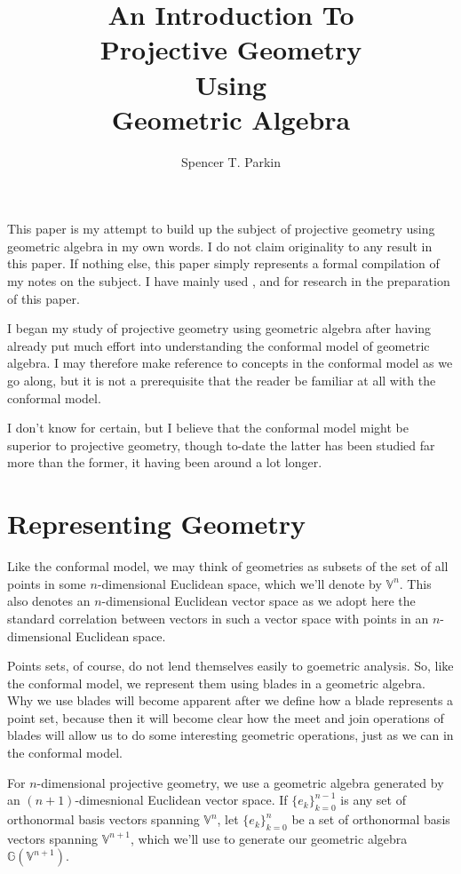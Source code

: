 \documentclass[12pt]{article}
\title{An Introduction To\\Projective Geometry\\Using\\Geometric Algebra}
\author{Spencer T. Parkin}
\newcommand{\G}{\mathbb{G}}
\newcommand{\V}{\mathbb{V}}
\begin{document}
\maketitle

This paper is my attempt to build up the subject of projective
geometry using geometric algebra in my own words.  I do not
claim originality to any result in this paper.  If nothing else, this
paper simply represents a formal compilation of my notes on the
subject.  I have mainly used \cite{hestenes91}, \cite{birchfield98} and \cite{dorst07}
for research in the preparation of this paper.

I began my study of projective geometry using geometric algebra
after having already put much effort into understanding the
conformal model of geometric algebra.  I may therefore make reference
to concepts in the conformal model as we go along, but it is not a
prerequisite that the reader be familiar at all with the conformal model.

I don't know for certain, but I believe that the conformal model
might be superior to projective geometry, though to-date the latter has
been studied far more than the former, it having been around a lot longer.

\section{Representing Geometry}

Like the conformal model, we may think of geometries as subsets of the
set of all points in some $n$-dimensional Euclidean space, which we'll
denote by $\V^n$.  This also denotes an $n$-dimensional Euclidean vector space
as we adopt here the standard correlation between vectors in such a vector space
with points in an $n$-dimensional Euclidean space.

Points sets, of course, do not lend themselves easily to goemetric analysis.  So,
like the conformal model, we represent them using blades in a geometric algebra.
Why we use blades will become apparent after we define how a blade represents
a point set, because then it will become clear how the meet and join operations
of blades will allow us to do some interesting geometric operations, just as we
can in the conformal model.

For $n$-dimensional projective geometry, we use a geometric algebra generated
by an $(n+1)$-dimesnional Euclidean vector space.  If $\{e_k\}_{k=0}^{n-1}$ is any set of orthonormal basis
vectors spanning $\V^n$, let $\{e_k\}_{k=0}^n$ be a set of
orthonormal basis vectors spanning $\V^{n+1}$, which we'll use to generate our
geometric algebra $\G(\V^{n+1})$.
\end{document}

